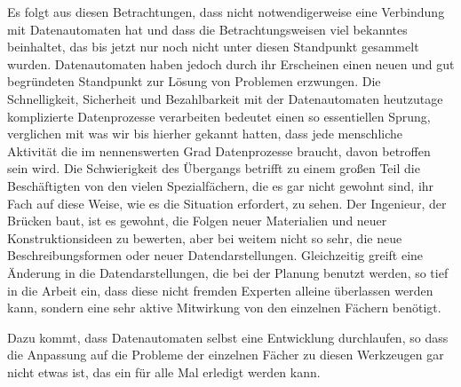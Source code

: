{Es folgt aus diesen Betrachtungen, dass  nicht notwendigerweise eine Verbindung mit Datenautomaten hat und dass die  Betrachtungsweisen viel bekanntes beinhaltet, das bis jetzt nur noch nicht unter diesen Standpunkt gesammelt wurden. Datenautomaten haben jedoch durch ihr Erscheinen einen neuen und gut begründeten  Standpunkt zur Lösung von Problemen erzwungen. Die Schnelligkeit, Sicherheit und Bezahlbarkeit mit der Datenautomaten heutzutage komplizierte Datenprozesse verarbeiten bedeutet einen so essentiellen Sprung, verglichen mit was wir bis hierher gekannt hatten, dass jede menschliche Aktivität die im nennenswerten Grad Datenprozesse braucht, davon betroffen sein wird. Die Schwierigkeit des Übergangs betrifft zu einem großen Teil die Beschäftigten von den vielen Spezialfächern, die es gar nicht gewohnt sind, ihr Fach auf diese Weise, wie es die Situation erfordert, zu sehen. Der Ingenieur, der Brücken baut, ist es gewohnt, die Folgen neuer Materialien und neuer Konstruktionsideen zu bewerten, aber bei weitem nicht so sehr, die neue Beschreibungsformen oder neuer Datendarstellungen. Gleichzeitig greift eine Änderung in die Datendarstellungen, die bei der Planung benutzt werden, so tief in die Arbeit ein, dass diese nicht fremden Experten alleine überlassen werden kann, sondern eine sehr aktive Mitwirkung von den einzelnen Fächern benötigt.

Dazu kommt, dass Datenautomaten selbst eine Entwicklung durchlaufen, so dass die Anpassung auf die Probleme der einzelnen Fächer zu diesen Werkzeugen gar nicht etwas ist, das ein für alle Mal erledigt werden kann.
}


